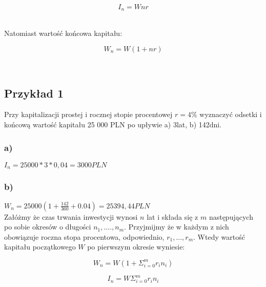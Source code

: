 \documentclass{article}
\begin{document}
\begin{center}
	\begin{equation}
		I_n = Wnr
	\end{equation}
\end{center}\\

Natomiast wartość końcowa kapitału:

\begin{center}
	\begin{equation}
		W_n = W(1+nr)
	\end{equation}
\end{center}\\

\newpage

\subsection{Przykład 1}
Przy kapitalizacji prostej i rocznej stopie procentowej $ r = 4\% $ wyznaczyć odsetki i końcową wartość kapitału 25 000 PLN po upływie a) 3lat, b) 142dni.\\

\subsubsection{a)}

$ I_n = 25 000 * 3 * 0,04 = 3 000 PLN $

\subsubsection{b)}

$ W_n = 25 000(1 + \frac{142}{360} + 0.04) = 25 394,44 PLN $\\

Załóżmy że czas trwania inwestycji wynosi $ n $ lat i składa się z $ m $ następujących po sobie okresów o długości $ n_1, ...., n_m $. Przyjmijmy że w każdym z nich obowiązuje roczna stopa procentowa, odpowiednio, $ r_1, ..., r_m $. Wtedy wartość kapitału początkowego $ W $ po pierwszym okresie wyniesie: 

\begin{center}
	\begin{equation}
		W_n = W(1 + \Sigma^m_{i=0}r_in_i)
	\end{equation}
\end{center}

\begin{center}
	\begin{equation}
		I_n = W\Sigma^m_{i=0}r_in_i
	\end{equation}
\end{center}\\
\end{document}
